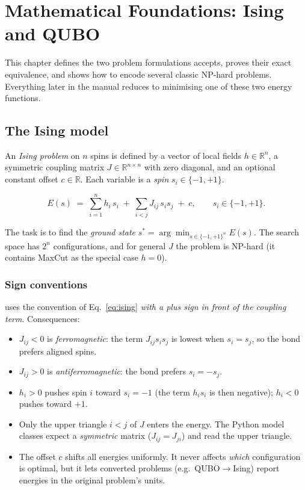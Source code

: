 \chapter{Mathematical Foundations: Ising and QUBO}
\label{ch:math}

This chapter defines the two problem formulations \qv{} accepts, proves their
exact equivalence, and shows how to encode several classic NP-hard problems.
Everything later in the manual reduces to minimising one of these two energy
functions.

\section{The Ising model}
\label{sec:ising}

An \emph{Ising problem} on $n$ spins is defined by a vector of local fields
$h\in\mathbb{R}^n$, a symmetric coupling matrix $J\in\mathbb{R}^{n\times n}$
with zero diagonal, and an optional constant offset $c\in\mathbb{R}$.
Each variable is a \emph{spin} $s_i\in\{-1,+1\}$.

\begin{keyeq}
\begin{equation}
E(s) \;=\; \sum_{i=1}^{n} h_i\, s_i \;+\; \sum_{i<j} J_{ij}\, s_i s_j \;+\; c,
\qquad s_i\in\{-1,+1\}.
\label{eq:ising}
\end{equation}
\end{keyeq}

The task is to find the \emph{ground state}
$s^\ast=\arg\min_{s\in\{-1,+1\}^n} E(s)$. The search space has $2^n$
configurations, and for general $J$ the problem is NP-hard (it contains
MaxCut as the special case $h=0$).

\subsection{Sign conventions}

\qv{} uses the convention of Eq.~\eqref{eq:ising} \emph{with a plus sign in
front of the coupling term}. Consequences:

\begin{itemize}
\item $J_{ij}<0$ is \emph{ferromagnetic}: the term $J_{ij}s_is_j$ is lowest
when $s_i=s_j$, so the bond prefers aligned spins.
\item $J_{ij}>0$ is \emph{antiferromagnetic}: the bond prefers $s_i=-s_j$.
\item $h_i>0$ pushes spin $i$ toward $s_i=-1$ (the term $h_is_i$ is then
negative); $h_i<0$ pushes toward $+1$.
\item Only the upper triangle $i<j$ of $J$ enters the energy. The Python
model classes expect a \emph{symmetric} matrix ($J_{ij}=J_{ji}$) and read
the upper triangle.
\item The offset $c$ shifts all energies uniformly. It never affects
\emph{which} configuration is optimal, but it lets converted problems (e.g.\
QUBO$\to$Ising) report energies in the original problem's units.
\end{itemize}

